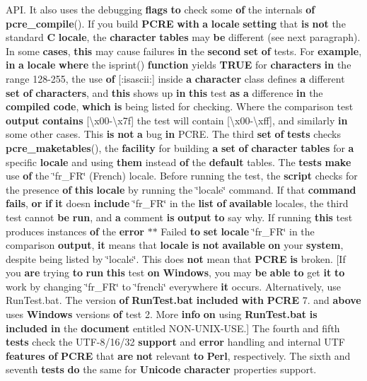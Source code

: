 A\+P\+I. It also uses the debugging {\bf flags} {\bf to} check some {\bf of} the internals {\bf of} {\bf pcre\+\_\+compile}(). If you build {\bf P\+C\+RE} {\bf with} {\bf a} {\bf locale} {\bf setting} that {\bf is} {\bf not} the standard {\bf C} {\bf locale}, the {\bf character} {\bf tables} may {\bf be} different (see next paragraph). In some {\bf cases}, {\bf this} may cause failures {\bf in} the {\bf second} {\bf set} {\bf of} tests. For {\bf example}, {\bf in} {\bf a} {\bf locale} {\bf where} the isprint() {\bf function} yields {\bf T\+R\+UE} for {\bf characters} {\bf in} the range 128-\/255, the use {\bf of} \mbox{[}\+:isascii\+:\mbox{]} inside {\bf a} {\bf character} class defines {\bf a} different {\bf set} {\bf of} {\bf characters}, and {\bf this} shows up {\bf in} {\bf this} test {\bf as} {\bf a} difference {\bf in} the {\bf compiled} {\bf code}, {\bf which} {\bf is} being listed for checking. Where the comparison test {\bf output} {\bf contains} \mbox{[}\textbackslash{}x00-\/\textbackslash{}x7f\mbox{]} the test will contain \mbox{[}\textbackslash{}x00-\/\textbackslash{}xff\mbox{]}, and similarly {\bf in} some other cases. This {\bf is} {\bf not} {\bf a} bug {\bf in} P\+C\+R\+E. The third {\bf set} {\bf of} {\bf tests} checks {\bf pcre\+\_\+maketables}(), the {\bf facility} for building {\bf a} {\bf set} {\bf of} {\bf character} {\bf tables} for {\bf a} specific {\bf locale} and using {\bf them} instead {\bf of} the {\bf default} tables. The {\bf tests} {\bf make} use {\bf of} the \char`\"{}fr\+\_\+\+FR\char`\"{} (French) locale. Before running the test, the {\bf script} checks for the presence {\bf of} {\bf this} {\bf locale} by running the \char`\"{}locale\char`\"{} command. If that {\bf command} {\bf fails}, {\bf or} {\bf if} {\bf it} doesn {\bf include} \char`\"{}fr\+\_\+\+FR\char`\"{} in the {\bf list} {\bf of} {\bf available} locales, the third test cannot {\bf be} {\bf run}, and {\bf a} comment {\bf is} {\bf output} {\bf to} say why. If running {\bf this} test produces instances {\bf of} the {\bf error} $\ast$$\ast$ Failed {\bf to} {\bf set} {\bf locale} \char`\"{}fr\+\_\+\+FR\char`\"{} in the comparison {\bf output}, {\bf it} means that {\bf locale} {\bf is} {\bf not} {\bf available} {\bf on} your {\bf system}, despite being listed by \char`\"{}locale\char`\"{}. This does {\bf not} mean that {\bf P\+C\+RE} {\bf is} broken. \mbox{[}If you {\bf are} trying {\bf to} {\bf run} {\bf this} test {\bf on} {\bf Windows}, you may {\bf be} {\bf able} {\bf to} get {\bf it} {\bf to} work by changing \char`\"{}fr\+\_\+\+FR\char`\"{} to \char`\"{}french\char`\"{} everywhere {\bf it} occurs. Alternatively, use Run\+Test.\+bat. The version {\bf of} {\bf Run\+Test.\+bat} {\bf included} {\bf with} {\bf P\+C\+RE} 7. and {\bf above} uses {\bf Windows} versions {\bf of} test 2. More {\bf info} {\bf on} using {\bf Run\+Test.\+bat} {\bf is} {\bf included} {\bf in} the {\bf document} entitled N\+ON-\/U\+N\+IX-\/U\+S\+E.\mbox{]} The fourth and fifth {\bf tests} check the U\+TF-\/8/16/32 {\bf support} and {\bf error} handling and internal U\+TF {\bf features} {\bf of} {\bf P\+C\+RE} that {\bf are} {\bf not} relevant {\bf to} {\bf Perl}, respectively. The sixth and seventh {\bf tests} {\bf do} the same for {\bf Unicode} {\bf character} properties support. 